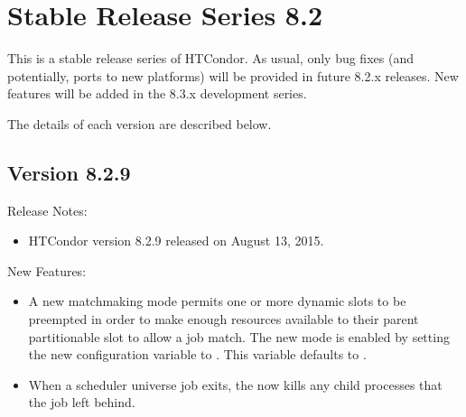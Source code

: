 
\section{\label{sec:History-8-2}Stable Release Series 8.2}

This is a stable release series of HTCondor.
As usual, only bug fixes (and potentially, ports to new platforms)
will be provided in future 8.2.x releases.
New features will be added in the 8.3.x development series.

The details of each version are described below.


\subsection*{\label{sec:New-8-2-9}Version 8.2.9}

\noindent Release Notes:

\begin{itemize}

\item HTCondor version 8.2.9 released on August 13, 2015.

\end{itemize}


\noindent New Features:

\begin{itemize}

\item A new matchmaking mode permits one or more dynamic slots to
be preempted in order to make enough resources available to their parent
partitionable slot to allow a job match.
The new mode is enabled by setting the new configuration variable
 to .
This variable defaults to .

\item When a scheduler universe job exits, the  now kills
any child processes that the job left behind.

\end{itemize}

